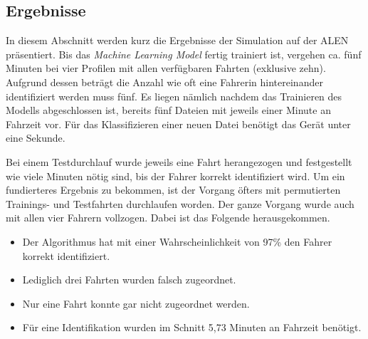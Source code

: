 \subsection{Ergebnisse}

In diesem Abschnitt werden kurz die Ergebnisse der Simulation auf der ALEN präsentiert. Bis das \textit{Machine Learning Model} fertig trainiert ist, vergehen ca. fünf Minuten bei vier Profilen mit allen verfügbaren Fahrten (exklusive zehn). Aufgrund dessen beträgt die Anzahl wie oft eine Fahrerin hintereinander identifiziert werden muss fünf. Es liegen nämlich nachdem das Trainieren des Modells abgeschlossen ist, bereits fünf Dateien mit jeweils einer Minute an Fahrzeit vor. Für das Klassifizieren einer neuen Datei benötigt das Gerät unter eine Sekunde.

Bei einem Testdurchlauf wurde jeweils eine Fahrt herangezogen und festgestellt wie viele Minuten nötig sind, bis der Fahrer korrekt identifiziert wird. Um ein fundierteres Ergebnis zu bekommen, ist der Vorgang öfters mit permutierten Trainings- und Testfahrten durchlaufen worden. Der ganze Vorgang wurde auch mit allen vier Fahrern vollzogen. Dabei ist das Folgende herausgekommen.

\begin{itemize}
    \item Der Algorithmus hat mit einer Wahrscheinlichkeit von 97\% den Fahrer korrekt identifiziert.
    \item Lediglich drei Fahrten wurden falsch zugeordnet.
    \item Nur eine Fahrt konnte gar nicht zugeordnet werden.
    \item Für eine Identifikation wurden im Schnitt 5,73 Minuten an Fahrzeit benötigt.
\end{itemize}